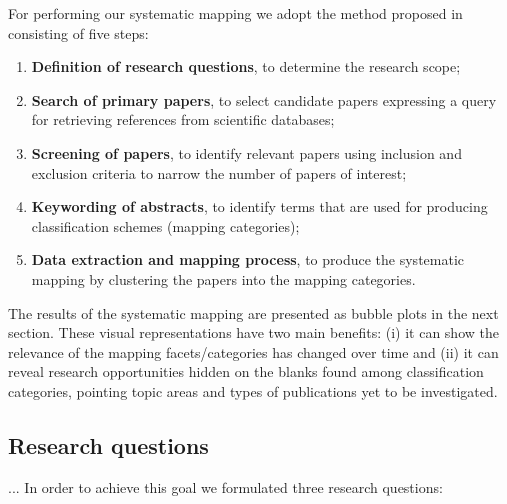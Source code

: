 For performing our systematic mapping we adopt the method proposed in \cite{SM} consisting  of five  steps: 
\begin{enumerate}
\item \textbf{Definition of research questions}, to determine the research
scope;  
\item \textbf{Search of primary papers}, to select candidate papers expressing a
query for retrieving references from scientific databases; 
\item \textbf{Screening of papers}, to identify relevant papers using
inclusion and exclusion criteria   to narrow
the number of papers of interest; 
\item \textbf{Keywording of abstracts}, to identify terms that are used
for producing  classification schemes (mapping categories); 
\item \textbf{Data extraction and mapping process}, to produce the systematic
mapping by clustering the papers into the mapping categories.
\end{enumerate}

The results of the systematic mapping are presented as
bubble plots in the next section. These visual representations have two main
benefits: (i) it can show the relevance of the mapping facets/categories
has changed over time and (ii) it can reveal research opportunities
hidden on the blanks found among classification categories, pointing
topic areas and types of publications yet to be investigated.

\subsection{Research questions}
\label{sec:ResearchQuestions}

... In order to achieve this goal we formulated three research questions:

